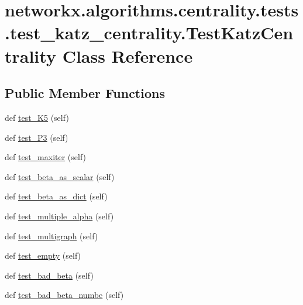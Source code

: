 \hypertarget{classnetworkx_1_1algorithms_1_1centrality_1_1tests_1_1test__katz__centrality_1_1TestKatzCentrality}{}\section{networkx.\+algorithms.\+centrality.\+tests.\+test\+\_\+katz\+\_\+centrality.\+Test\+Katz\+Centrality Class Reference}
\label{classnetworkx_1_1algorithms_1_1centrality_1_1tests_1_1test__katz__centrality_1_1TestKatzCentrality}
\subsection*{Public Member Functions}
\begin{DoxyCompactItemize}
\item 
def \hyperlink{classnetworkx_1_1algorithms_1_1centrality_1_1tests_1_1test__katz__centrality_1_1TestKatzCentrality_a30c6f31306dd4c393b7ea60700ebfe20}{test\+\_\+\+K5} (self)
\item 
def \hyperlink{classnetworkx_1_1algorithms_1_1centrality_1_1tests_1_1test__katz__centrality_1_1TestKatzCentrality_aa1cf5eccb8931de6aeada68591fa472b}{test\+\_\+\+P3} (self)
\item 
def \hyperlink{classnetworkx_1_1algorithms_1_1centrality_1_1tests_1_1test__katz__centrality_1_1TestKatzCentrality_afdb2df7cf7f01d1e11ffa23d1ff7036a}{test\+\_\+maxiter} (self)
\item 
def \hyperlink{classnetworkx_1_1algorithms_1_1centrality_1_1tests_1_1test__katz__centrality_1_1TestKatzCentrality_aac4216a109272fc92dfd49a65e656740}{test\+\_\+beta\+\_\+as\+\_\+scalar} (self)
\item 
def \hyperlink{classnetworkx_1_1algorithms_1_1centrality_1_1tests_1_1test__katz__centrality_1_1TestKatzCentrality_ae6646f8083e6538e6264c3e80b74308f}{test\+\_\+beta\+\_\+as\+\_\+dict} (self)
\item 
def \hyperlink{classnetworkx_1_1algorithms_1_1centrality_1_1tests_1_1test__katz__centrality_1_1TestKatzCentrality_aca7b9ea933a70bcb1fc03bea0e7cf6e1}{test\+\_\+multiple\+\_\+alpha} (self)
\item 
def \hyperlink{classnetworkx_1_1algorithms_1_1centrality_1_1tests_1_1test__katz__centrality_1_1TestKatzCentrality_aea991519893c374adab89f7be9058acf}{test\+\_\+multigraph} (self)
\item 
def \hyperlink{classnetworkx_1_1algorithms_1_1centrality_1_1tests_1_1test__katz__centrality_1_1TestKatzCentrality_ac3abc1fa6d95f9e7c00cd0c036c8e6fc}{test\+\_\+empty} (self)
\item 
def \hyperlink{classnetworkx_1_1algorithms_1_1centrality_1_1tests_1_1test__katz__centrality_1_1TestKatzCentrality_aed72d6de388d15f9b3bce9ef661a6da7}{test\+\_\+bad\+\_\+beta} (self)
\item 
def \hyperlink{classnetworkx_1_1algorithms_1_1centrality_1_1tests_1_1test__katz__centrality_1_1TestKatzCentrality_af3a59600458c0b24b321d1e49c7b4446}{test\+\_\+bad\+\_\+beta\+\_\+numbe} (self)
\end{DoxyCompactItemize}


